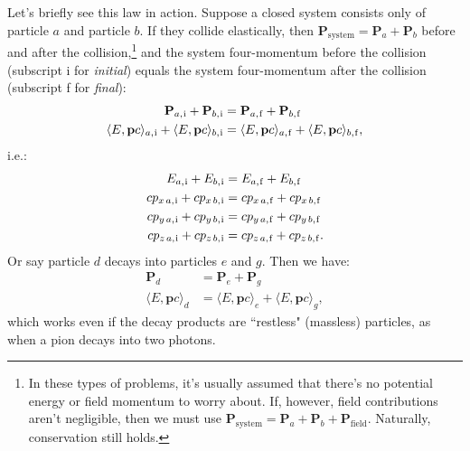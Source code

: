 \documentclass[12pt]{article}
\renewcommand{\vv}[1]{\mathbf{#1}}
\begin{document}
Let's briefly see this law in action. Suppose a closed system consists only of particle $a$ and particle $b$. If they collide elastically, then $\vv P_{\mathrm{system}} = \vv P_a + \vv P_b$ before and after the collision,\footnote{In these types of problems, it's usually assumed that there's no potential energy or field momentum to worry about. If, however, field contributions aren't negligible, then we must use $\vv P_{\mathrm{system}} = \vv P_a + \vv P_b + \vv P_{\mathrm{field}}$. Naturally, conservation still holds.} and the system four-momentum before the collision (subscript i for \emph{initial}) equals the system four-momentum after the collision (subscript f for \emph{final}):
\begin{equation*}
\begin{aligned}
\vv P_{a, \mkern1mu \mathrm{i}} + \vv P_{b, \mkern1mu \mathrm{i}} &= \vv P_{a, \mkern1mu \mathrm{f}} + \vv P_{b, \mkern1mu \mathrm{f}}\\
\langle E, \vv p c \rangle_{a, \mkern1mu \mathrm{i}} + \langle E, \vv p c \rangle_{b, \mkern1mu \mathrm{i}} &= \langle E, \vv p c \rangle_{a, \mkern1mu \mathrm{f}} + \langle E, \vv p c \rangle_{b, \mkern1mu \mathrm{f}},
\end{aligned}
\end{equation*}
i.e.:
\begin{equation*}
\begin{split}
E_{a, \mkern1mu \mathrm{i}} + E_{b, \mkern1mu \mathrm{i}} &= E_{a, \mkern1mu \mathrm{f}} + E_{b, \mkern1mu \mathrm{f}}\\
cp_{x\,a, \mkern1mu \mathrm{i}} + cp_{x\,b, \mkern1mu \mathrm{i}} &= cp_{x\,a, \mkern1mu \mathrm{f}} + cp_{x\,b, \mkern1mu \mathrm{f}}\\
cp_{y\,a, \mkern1mu \mathrm{i}} + cp_{y\,b, \mkern1mu \mathrm{i}} &= cp_{y\,a, \mkern1mu \mathrm{f}} + cp_{y\,b, \mkern1mu \mathrm{f}}\\
cp_{z\,a, \mkern1mu \mathrm{i}} + cp_{z\,b, \mkern1mu \mathrm{i}} &= cp_{z\,a, \mkern1mu \mathrm{f}} + cp_{z\,b, \mkern1mu \mathrm{f}}.
\end{split}
\end{equation*}
Or say particle $d$ decays into particles $e$ and $g$. Then we have:
\begin{equation*}
\begin{split}
\vv P_d &= \vv P_e + \vv P_g\\
\langle E, \vv p c \rangle_{d} &= \langle E, \vv p c \rangle_{e} + \langle E, \vv p c \rangle_{g},
\end{split}
\end{equation*}
which works even if the decay products are ``restless" (massless) particles, as when a pion decays into two photons.
\end{document}
